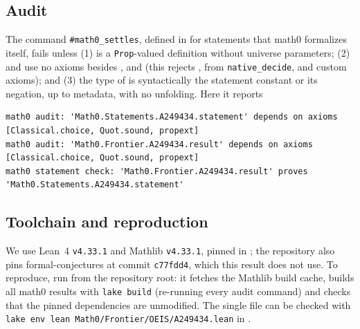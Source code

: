 \documentclass[11pt]{amsart}
\theoremstyle{plain}
\theoremstyle{definition}
\begin{document}
\subsection*{Audit}
The command \texttt{\#math0\_settles}, defined in  for statements that math0 formalizes itself, fails unless (1)  is a \texttt{Prop}-valued definition without universe parameters; (2)  and  use no axioms besides ,  and  (this rejects ,  from \texttt{native\_decide}, and custom axioms); and (3) the type of  is syntactically the statement constant or its negation, up to metadata, with no unfolding. Here it reports
\begin{lstlisting}[basicstyle=\ttfamily\scriptsize]
math0 audit: 'Math0.Statements.A249434.statement' depends on axioms [Classical.choice, Quot.sound, propext]
math0 audit: 'Math0.Frontier.A249434.result' depends on axioms [Classical.choice, Quot.sound, propext]
math0 statement check: 'Math0.Frontier.A249434.result' proves 'Math0.Statements.A249434.statement'
\end{lstlisting}

\subsection*{Toolchain and reproduction}
We use Lean~4 \cite{Lean4} \texttt{v4.33.1} and Mathlib \cite{Mathlib} \texttt{v4.33.1}, pinned in ; the repository also pins formal-conjectures \cite{FC} at commit \texttt{c77fdd4}, which this result does not use.
To reproduce, run  from the repository root: it fetches the Mathlib build cache, builds all math0 results with \texttt{lake build} (re-running every audit command) and checks that the pinned dependencies are unmodified. The single file can be checked with \texttt{lake env lean Math0/Frontier/OEIS/A249434.lean} in .
\end{document}
